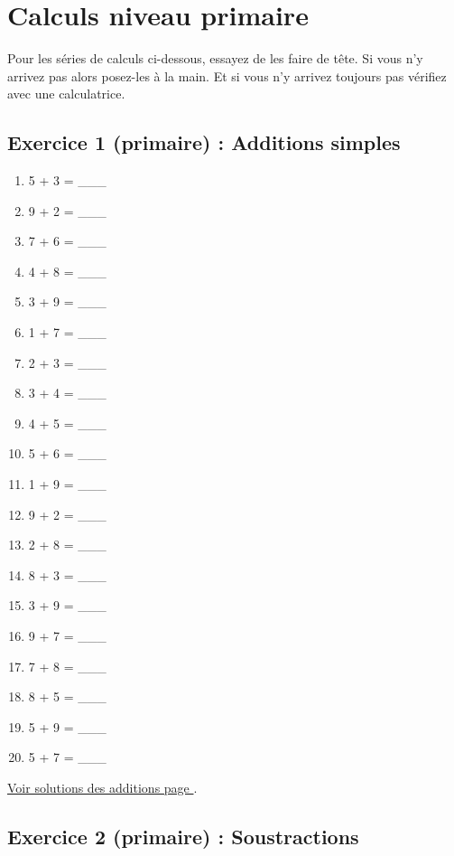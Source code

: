 \section{Calculs niveau primaire}

Pour les séries de calculs ci-dessous, essayez de les faire de tête. Si vous n'y arrivez pas alors posez-les à la main. Et si vous n'y arrivez toujours pas vérifiez avec une calculatrice. 

\newpage

\subsection{Exercice 1 (primaire) : Additions simples}


\label{calc:niveau1}

\begin{enumerate}[label=C\arabic*)]
    \item 5 + 3 = \_\_\_
    \item 9 + 2 = \_\_\_
    \item 7 + 6 = \_\_\_
    \item 4 + 8 = \_\_\_
    \item 3 + 9 = \_\_\_
    \item 1 + 7 = \_\_\_
    \item 2 + 3 = \_\_\_
    \item 3 + 4 = \_\_\_
    \item 4 + 5 = \_\_\_
    \item 5 + 6 = \_\_\_
    \item 1 + 9 = \_\_\_
    \item 9 + 2 = \_\_\_
    \item 2 + 8 = \_\_\_
    \item 8 + 3 = \_\_\_
    \item 3 + 9 = \_\_\_
    \item 9 + 7 = \_\_\_
    \item 7 + 8 = \_\_\_
    \item 8 + 5 = \_\_\_
    \item 5 + 9 = \_\_\_
    \item 5 + 7 = \_\_\_
\end{enumerate}

\hyperref[sol:niveau1]{Voir solutions des additions page \pageref{sol:niveau1}}.

\newpage


\subsection{Exercice 2 (primaire) : Soustractions}


